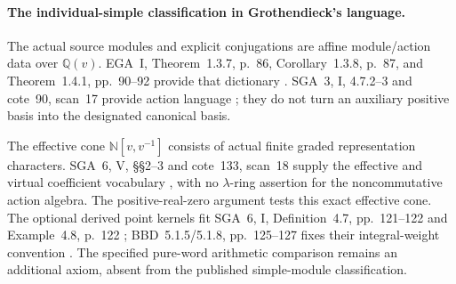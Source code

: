 \paragraph{The  individual-simple classification in Grothendieck's language.}
The actual source modules and explicit conjugations
are affine module/action data over \(\mathbb Q(v)\).
EGA~I, Theorem~1.3.7, p.~86, Corollary~1.3.8, p.~87,
and Theorem~1.4.1, pp.~90--92 provide that dictionary
\cite{EGA}. SGA~3, I, 4.7.2--3 and cote~90, scan~17
provide action language \cite{SGA3,Archive}; they do
not turn an auxiliary positive basis into the
designated canonical basis.

The effective cone \(\mathbb N[v,v^{-1}]\) consists
of actual finite graded representation characters.
SGA~6, V, \S\S2--3 and cote~133, scan~18 supply
the effective and virtual coefficient vocabulary
\cite{SGA6,Archive}, with no \(\lambda\)-ring
assertion for the noncommutative action algebra.
The positive-real-zero argument tests this exact
effective cone. The optional derived point kernels
fit SGA~6, I, Definition~4.7, pp.~121--122 and
Example~4.8, p.~122 \cite{SGA6}; BBD~5.1.5/5.1.8,
pp.~125--127 fixes their integral-weight convention
\cite{BBD}. The specified pure-word arithmetic
comparison remains an additional axiom, absent
from the published simple-module classification.
